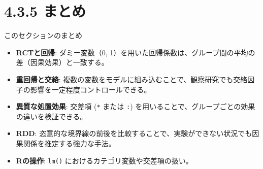 \documentclass[
  ignorenonframetext,
]{beamer}
\providecommand{\tightlist}{%
  \setlength{\itemsep}{0pt}\setlength{\parskip}{0pt}}
\begin{document}
\hypertarget{ux307eux3068ux3081}{%
\section{4.3.5 まとめ}\label{ux307eux3068ux3081}}

\begin{frame}[fragile]{このセクションのまとめ}
\protect\hypertarget{ux3053ux306eux30bbux30afux30b7ux30e7ux30f3ux306eux307eux3068ux3081}{}
\begin{itemize}
\tightlist
\item
  \textbf{RCTと回帰}: ダミー変数（0,
  1）を用いた回帰係数は、グループ間の平均の差（因果効果）と一致する。
\item
  \textbf{重回帰と交絡}:
  複数の変数をモデルに組み込むことで、観察研究でも交絡因子の影響を一定程度コントロールできる。
\item
  \textbf{異質な処置効果}: 交差項 (\texttt{*} または \texttt{:})
  を用いることで、グループごとの効果の違いを検証できる。
\item
  \textbf{RDD}:
  恣意的な境界線の前後を比較することで、実験ができない状況でも因果関係を推定する強力な手法。
\item
  \textbf{Rの操作}: \texttt{lm()} におけるカテゴリ変数や交差項の扱い。
\end{itemize}
\end{frame}
\end{document}
